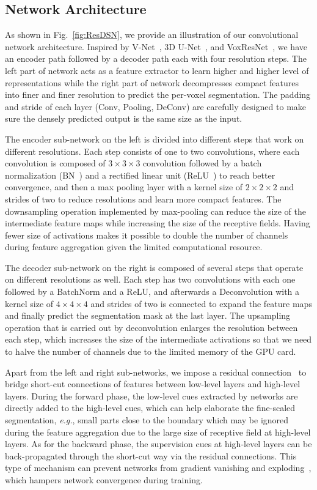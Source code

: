\documentclass[10pt,twocolumn,letterpaper]{article}
\begin{document}
\subsection{Network Architecture}\label{Sec:NetworkArchietcture}
As shown in Fig.~\ref{fig:ResDSN}, we provide an illustration of our convolutional network architecture. Inspired by V-Net~\cite{milletari2016v}, 3D U-Net~\cite{cciccek20163d}, and VoxResNet~\cite{chen2017voxresnet}, we have an encoder path followed by a decoder path each with four resolution steps. The left part of network acts as a feature extractor to learn higher and higher level of representations while the right part of network decompresses compact features into finer and finer resolution to predict the per-voxel segmentation. The padding and stride of each layer (Conv, Pooling, DeConv) are carefully designed to make sure the densely predicted output is the same size as the input.

The encoder sub-network on the left is divided into different steps that work on different resolutions. Each step consists of one to two convolutions, where each convolution is composed of $3\times 3\times 3$ convolution followed by a batch normalization (BN~\cite{ioffe2015batch}) and a rectified linear unit (ReLU~\cite{nair2010rectified}) to reach better convergence, and then a max pooling layer with a kernel size of $2\times 2\times 2$ and strides of two to reduce resolutions and learn more compact features. The downsampling operation implemented by max-pooling can reduce the size of the intermediate feature maps while increasing the size of the receptive fields. Having fewer size of activations makes it possible to double the number of channels during feature aggregation given the limited computational resource. 

The decoder sub-network on the right is composed of several steps that operate on different resolutions as well. Each step has two convolutions with each one followed by a BatchNorm and a ReLU, and afterwards a Deconvolution with a kernel size of $4\times 4 \times 4$ and strides of two is connected to expand the feature maps and finally predict the segmentation mask at the last layer. The upsampling operation that is carried out by deconvolution enlarges the resolution between each step, which increases the size of the intermediate activations so that we need to halve the number of channels due to the limited memory of the GPU card.

Apart from the left and right sub-networks, we impose a residual connection~\cite{he2016deep} to bridge short-cut connections of features between low-level layers and high-level layers. During the forward phase, the low-level cues extracted by networks are directly added to the high-level cues, which can help elaborate the fine-scaled segmentation, \emph{e.g.}, small parts close to the boundary which may be ignored during the feature aggregation due to the large size of receptive field at high-level layers. 
As for the backward phase, the supervision cues at high-level layers can be back-propagated through the short-cut way via the residual connections. This type of mechanism can prevent networks from gradient vanishing and exploding~\cite{glorot2010understanding}, which hampers network convergence during training.
\end{document}

